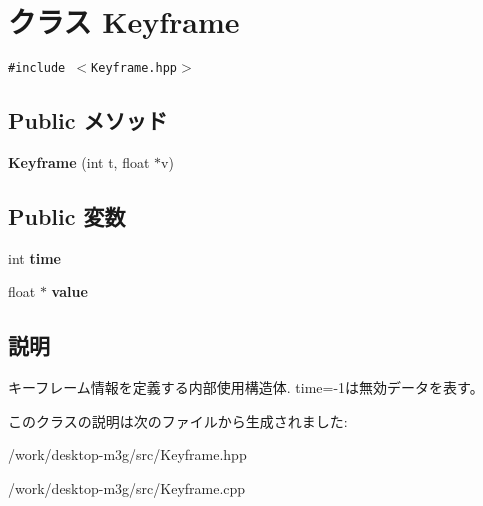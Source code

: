 \hypertarget{classm3g_1_1Keyframe}{
\section{クラス Keyframe}
\label{classm3g_1_1Keyframe}
}
{\tt \#include $<$Keyframe.hpp$>$}

\subsection*{Public メソッド}
\begin{CompactItemize}
\item 
\hypertarget{classm3g_1_1Keyframe_8d7b239b0b22e155001b100c80a9680b}{
\textbf{Keyframe} (int t, float $\ast$v)}
\label{classm3g_1_1Keyframe_8d7b239b0b22e155001b100c80a9680b}

\end{CompactItemize}
\subsection*{Public 変数}
\begin{CompactItemize}
\item 
\hypertarget{classm3g_1_1Keyframe_42715f65f02da52edc5b22021d8ae670}{
int \textbf{time}}
\label{classm3g_1_1Keyframe_42715f65f02da52edc5b22021d8ae670}

\item 
\hypertarget{classm3g_1_1Keyframe_b8d14ba2f5911cadc861b9b89ae0c605}{
float $\ast$ \textbf{value}}
\label{classm3g_1_1Keyframe_b8d14ba2f5911cadc861b9b89ae0c605}

\end{CompactItemize}


\subsection{説明}
キーフレーム情報を定義する内部使用構造体. time=-1は無効データを表す。 

このクラスの説明は次のファイルから生成されました:\begin{CompactItemize}
\item 
/work/desktop-m3g/src/Keyframe.hpp\item 
/work/desktop-m3g/src/Keyframe.cpp\end{CompactItemize}
